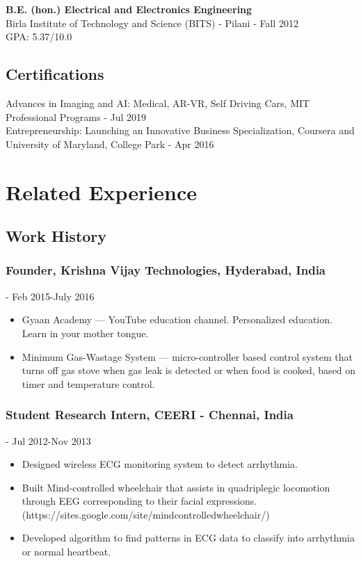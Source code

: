 \documentclass{article}
\begin{document}
\noindent
\textbf{B.E. (hon.) Electrical and Electronics Engineering}\\
\noindent
Birla Institute of Technology and Science (BITS) - Pilani \hfill - Fall 2012\\
\noindent
GPA: 5.37/10.0


\subsection{Certifications}
Advances in Imaging and AI: Medical, AR-VR, Self Driving Cars, MIT Professional Programs \hfill - Jul 2019\\

\noindent
Entrepreneurship: Launching an Innovative Business Specialization, Coursera and University of Maryland, College Park \hfill - Apr 2016

\section{Related Experience}
\subsection{Work History}

\subsubsection{Founder, Krishna Vijay Technologies, Hyderabad, India} \hfill - Feb 2015-July 2016
\begin{itemize}
    \item Gyaan Academy --- YouTube education channel. Personalized education. Learn in your mother tongue.
    \item Minimum Gas-Wastage System --- micro-controller based control system that turns off gas stove when gas leak is detected or when food is cooked, based on timer and temperature control.
\end{itemize}
    
\subsubsection{Student Research Intern, CEERI - Chennai, India} \hfill - Jul 2012-Nov 2013
\begin{itemize}
    \item Designed wireless ECG monitoring system to detect arrhythmia.
    \item Built Mind-controlled wheelchair that assists in quadriplegic locomotion through EEG corresponding to their facial expressions.
    (https://sites.google.com/site/mindcontrolledwheelchair/)
    \item Developed algorithm to find patterns in ECG data to classify into arrhythmia or normal heartbeat.
\end{itemize}
\end{document}
